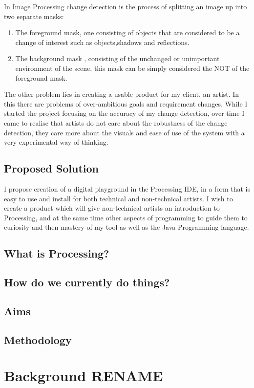 \documentclass[a4paper]{report}
\begin{document}
In Image Processing change detection is the process of splitting an image up into two separate masks:
\begin{enumerate}
  \item The foreground mask, one consisting of objects that are considered to be a change of interest such as objects,shadows and reflections.
  \item The background mask , consisting of the unchanged or unimportant environment of the scene, this mask can be simply considered the NOT of the foreground mask.
\end{enumerate}

The other problem lies in creating a usable product for my client, an artist. In this there are problems of over-ambitious goals and requirement changes. While I started the project focusing on the accuracy of my change detection, over time I came to realise that artists do not care about the robustness of the change detection, they care more about the visuals and ease of use of the system with a very experimental way of thinking.

\subsection{Proposed Solution}
I propose creation of a digital playground in the Processing\cite{PROCESSING} IDE, in a form that is easy to use and install for both technical and non-technical artists. I wish to create a product which will give non-technical artists an introduction to Processing, and at the same time other aspects of programming to guide them to curiosity and then mastery of my tool as well as the Java Programming language.
\subsection{What is Processing?}
\subsection{How do we currently do things?}
\subsection{Aims}
\subsection{Methodology}

\section{Background RENAME}
\end{document}
